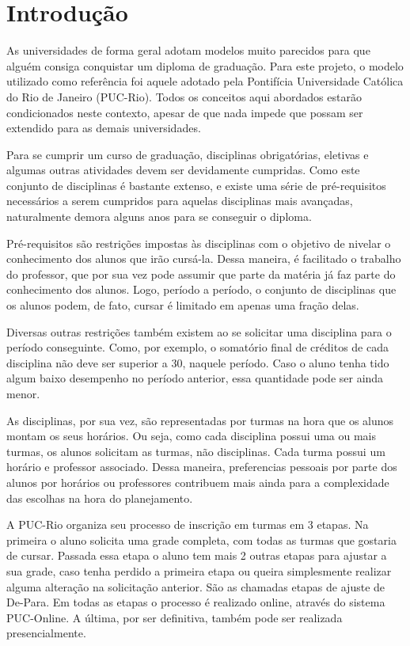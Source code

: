 \documentclass[graduacao,brazil]{ThesisPUC}
\begin{document}
\chapter{Introdução}

As universidades de forma geral adotam modelos muito parecidos para que alguém consiga conquistar um diploma de graduação. Para este projeto, o modelo utilizado como referência foi aquele adotado pela Pontifícia Universidade Católica do Rio de Janeiro (PUC-Rio). Todos os conceitos aqui abordados estarão condicionados neste contexto, apesar de que nada impede que possam ser extendido para as demais universidades.

Para se cumprir um curso de graduação, disciplinas obrigatórias, eletivas e algumas outras atividades devem ser devidamente cumpridas. Como este conjunto de disciplinas é bastante extenso, e existe uma série de pré-requisitos necessários a serem cumpridos para aquelas disciplinas mais avançadas, naturalmente demora alguns anos para se conseguir o diploma.

Pré-requisitos são restrições impostas às disciplinas com o objetivo de nivelar o conhecimento dos alunos que irão cursá-la. Dessa maneira, é facilitado o trabalho do professor, que por sua vez pode assumir que parte da matéria já faz parte do conhecimento dos alunos. Logo, período a período, o conjunto de disciplinas que os alunos podem, de fato, cursar é limitado em apenas uma fração delas.

Diversas outras restrições também existem ao se solicitar uma disciplina para o período conseguinte. Como, por exemplo, o somatório final de créditos de cada disciplina não deve ser superior a 30, naquele período. Caso o aluno tenha tido algum baixo desempenho no período anterior, essa quantidade pode ser ainda menor.

As disciplinas, por sua vez, são representadas por turmas na hora que os alunos montam os seus horários. Ou seja, como cada disciplina possui uma ou mais turmas, os alunos solicitam as turmas, não disciplinas. Cada turma possui um horário e professor associado. Dessa maneira, preferencias pessoais por parte dos alunos por horários ou professores contribuem mais ainda para a complexidade das escolhas na hora do planejamento.

A PUC-Rio organiza seu processo de inscrição em turmas em 3 etapas. Na primeira o aluno solicita uma grade completa, com todas as turmas que gostaria de cursar. Passada essa etapa o aluno tem mais 2 outras etapas para ajustar a sua grade, caso tenha perdido a primeira etapa ou queira simplesmente realizar alguma alteração na solicitação anterior. São as chamadas etapas de ajuste de De-Para. Em todas as etapas o processo é realizado online, através do sistema PUC-Online. A última, por ser definitiva, também pode ser realizada presencialmente.
\end{document}
